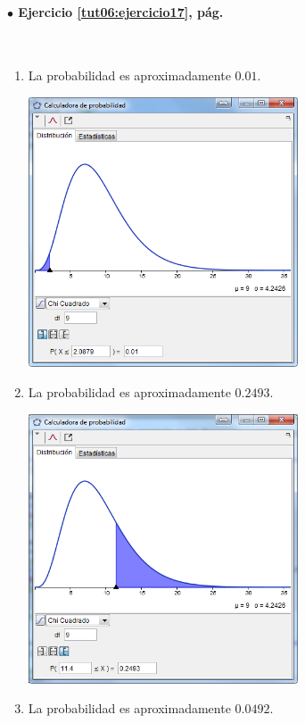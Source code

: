 \documentclass[10pt,a4paper]{article}\usepackage[]{graphicx}\usepackage[]{color}
\begin{document}
\paragraph{\bf $\bullet$ Ejercicio \ref{tut06:ejercicio17}, pág. \pageref{tut06:ejercicio17}}
\label{tut06:ejercicio17:sol}\quad\\

\begin{enumerate}
  \item La probabilidad es aproximadamente  $0.01$.\quad\\
    \begin{center}
    \includegraphics[width=8cm]{../fig/Tut06-30.png}
    \end{center}
  \item La probabilidad es aproximadamente  $0.2493$.\quad\\
    \begin{center}
    \includegraphics[width=8cm]{../fig/Tut06-31.png}
    \end{center}
  \item La probabilidad es aproximadamente  $0.0492$.\quad\\

\end{enumerate}
\end{document}
